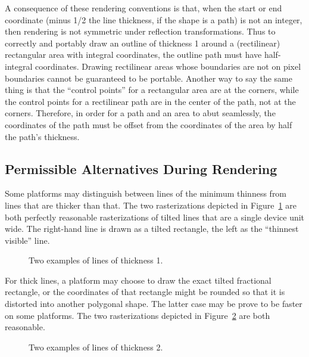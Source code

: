 A consequence of these rendering conventions is that, when the start or end
coordinate (minus 1/2 the line thickness, if the shape is a path) is not an
integer, then rendering is not symmetric under reflection transformations.  Thus
to correctly and portably draw an outline of thickness 1 around a (rectilinear)
rectangular area with integral coordinates, the outline path must have
half-integral coordinates.  Drawing rectilinear areas whose boundaries are not
on pixel boundaries cannot be guaranteed to be portable.  Another way to say the
same thing is that the ``control points'' for a rectangular area are at the
corners, while the control points for a rectilinear path are in the center of
the path, not at the corners.  Therefore, in order for a path and an area to
abut seamlessly, the coordinates of the path must be offset from the coordinates
of the area by half the path's thickness.

\subsection {Permissible Alternatives During Rendering}

Some platforms may distinguish between lines of the minimum thinness from lines
that are thicker than that.  The two rasterizations depicted in
Figure~\ref{thin-lines} are both perfectly reasonable rasterizations of tilted
lines that are a single device unit wide.  The right-hand line is drawn as a
tilted rectangle, the left as the ``thinnest visible'' line.

\begin{figure}
\ifpsfig\centerline{}\else\vspace{2.5in}\fi
\caption{\label{thin-lines} Two examples of lines of thickness 1.}
\end{figure}

For thick lines, a platform may choose to draw the exact tilted fractional
rectangle, or the coordinates of that rectangle might be rounded so that it is
distorted into another polygonal shape.  The latter case may be prove to be
faster on some platforms.  The two rasterizations depicted in
Figure~\ref{thick-lines} are both reasonable.

\begin{figure}
\ifpsfig\centerline{}\else\vspace{2.5in}\fi
\caption{\label{thick-lines} Two examples of lines of thickness 2.}
\end{figure}

